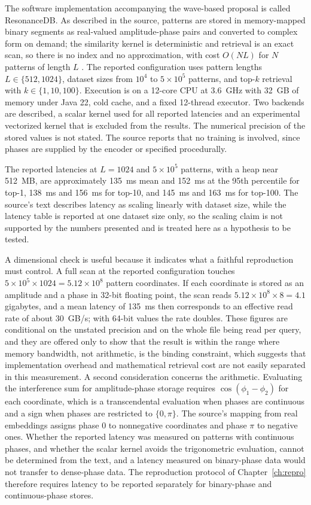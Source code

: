The software implementation accompanying the wave-based proposal is called ResonanceDB. As described in the source, patterns are stored in memory-mapped binary segments as real-valued amplitude-phase pairs and converted to complex form on demand; the similarity kernel is deterministic and retrieval is an exact scan, so there is no index and no approximation, with cost $O(NL)$ for $N$ patterns of length $L$ \cite{listopad2025}. The reported configuration uses pattern lengths $L\in\{512,1024\}$, dataset sizes from $10^4$ to $5\times10^5$ patterns, and top-$k$ retrieval with $k\in\{1,10,100\}$. Execution is on a 12-core CPU at 3.6~GHz with 32~GB of memory under Java 22, cold cache, and a fixed 12-thread executor. Two backends are described, a scalar kernel used for all reported latencies and an experimental vectorized kernel that is excluded from the results. The numerical precision of the stored values is not stated. The source reports that no training is involved, since phases are supplied by the encoder or specified procedurally.

The reported latencies at $L=1024$ and $5\times10^5$ patterns, with a heap near 512~MB, are approximately 135~ms mean and 152~ms at the 95th percentile for top-1, 138~ms and 156~ms for top-10, and 145~ms and 163~ms for top-100. The source's text describes latency as scaling linearly with dataset size, while the latency table is reported at one dataset size only, so the scaling claim is not supported by the numbers presented and is treated here as a hypothesis to be tested.

A dimensional check is useful because it indicates what a faithful reproduction must control. A full scan at the reported configuration touches $5\times10^5\times1024=5.12\times10^8$ pattern coordinates. If each coordinate is stored as an amplitude and a phase in 32-bit floating point, the scan reads $5.12\times10^8\times8=4.1$ gigabytes, and a mean latency of 135~ms then corresponds to an effective read rate of about $30$~GB/s; with 64-bit values the rate doubles. These figures are conditional on the unstated precision and on the whole file being read per query, and they are offered only to show that the result is within the range where memory bandwidth, not arithmetic, is the binding constraint, which suggests that implementation overhead and mathematical retrieval cost are not easily separated in this measurement. A second consideration concerns the arithmetic. Evaluating the interference sum for amplitude-phase storage requires $\cos(\phi_1-\phi_2)$ for each coordinate, which is a transcendental evaluation when phases are continuous and a sign when phases are restricted to $\{0,\pi\}$. The source's mapping from real embeddings assigns phase $0$ to nonnegative coordinates and phase $\pi$ to negative ones. Whether the reported latency was measured on patterns with continuous phases, and whether the scalar kernel avoids the trigonometric evaluation, cannot be determined from the text, and a latency measured on binary-phase data would not transfer to dense-phase data. The reproduction protocol of Chapter~\ref{ch:repro} therefore requires latency to be reported separately for binary-phase and continuous-phase stores.

